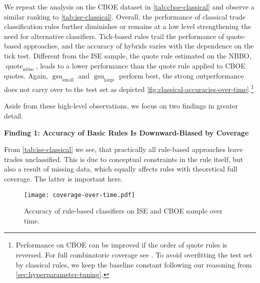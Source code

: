 We repeat the analysis on the \gls{CBOE} dataset in \cref{tab:cboe-classical} and observe a similar ranking to \cref{tab:ise-classical}. Overall, the performance of classical trade classification rules further diminishes or remains at a low level strengthening the need for alternative classifiers. Tick-based rules trail the performance of quote-based approaches, and the accuracy of hybrids varies with the dependence on the tick test. Different from the \gls{ISE} sample, the quote rule estimated on the \gls{NBBO}, $\operatorname{quote}_{\mathrm{nbbo}}$, leads to a lower performance than the quote rule applied to \gls{CBOE} quotes.
Again, $\operatorname{gsu}_{\mathrm{small}}$ and $\operatorname{gsu}_{\mathrm{large}}$ perform best, the strong outperformance does not carry over to the test set as depicted \cref{fig:classical-accuracies-over-time}.\footnote{Performance on \gls{CBOE} can be improved if the order of quote rules is reversed. For full combinatoric coverage see \textcite[][33]{grauerOptionTradeClassification2022}. To avoid overfitting the test set by classical rules, we keep the baseline constant following our reasoning from \cref{sec:hyperparameter-tuning}.}

Aside from these high-level observations, we focus on two findings in greater detail.

\textbf{Finding 1: Accuracy of Basic Rules Is Downward-Biased by Coverage}

From \cref{tab:ise-classical} we see, that practically all rule-based approaches leave trades unclassified. This is due to conceptual constraints in the rule itself, but also a result of missing data, which equally affects rules with theoretical full coverage. The latter is important here.

\begin{figure}[!h]
    \centering
    \texttt{[image: coverage-over-time.pdf]}
    \caption[Coverage Of Rule-Based Classifiers On  and  Over Time]{Accuracy of rule-based classifiers on \gls{ISE} and \gls{CBOE} sample over time.}
    \label{fig:classical-coverage-over-time}
\end{figure}

